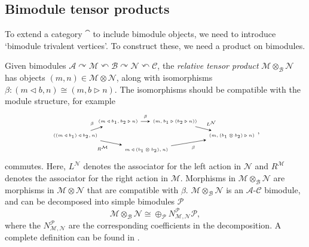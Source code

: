 
\subsection{Bimodule tensor products}\label{sec:bimodtensor}

To extend a category $\cat$ to include bimodule objects, we need to introduce `bimodule trivalent vertices'. To construct these, we need a product on bimodules. 

\begin{definition}
	Given bimodules $\mathcal{A}\curvearrowright\mathcal{M}\curvearrowleft\mathcal{B}\curvearrowright{\mathcal{N}}\curvearrowleft\mathcal{C}$, the \emph{relative tensor product} $\mathcal{M}\otimes_\mathcal{B}\mathcal{N}$ has objects $(m,n)\in \mathcal{M}\otimes\mathcal{N}$, along with isomorphisms $\beta:(m\triangleleft b,n)\cong(m,b\triangleright n)$. The isomorphisms should be compatible with the module structure, for example
	\begin{align}
	\begin{tikzpicture}[scale=.6,baseline=(current bounding box.center)]
	\node (A) at (-1,0) {\tiny{$((m\triangleleft b_1)\triangleleft b_2,n)$}};
	\node (B) at (2,1) {\tiny{$(m\triangleleft b_1,b_2\triangleright n)$}};
	\node (C) at (6,1) {\tiny{$(m,b_1\triangleright(b_2\triangleright n))$}};
	\node (D) at (10,0) {\tiny{$(m,(b_1\otimes b_2)\triangleright n)$}};
	\node (E) at (4,-1) {\tiny{$m\triangleleft (b_1\otimes b_2), n)$}};
	\draw [-stealth,above left] (A)--(B) node [pos=.5] {\tiny{$\beta$}};
	\draw [-stealth,above] (B)--(C) node [pos=.5] {\tiny{$\beta$}};
	\draw [-stealth,above right] (C)--(D) node [pos=.5] {\tiny{$L^\mathcal{N}$}};
	\draw [-stealth,below left] (A)--(E) node [pos=.5] {\tiny{$R^{\mathcal{M}}$}};
	\draw [-stealth,below right] (E)--(D) node [pos=.5] {\tiny{$\beta$}};
	\end{tikzpicture},
	\end{align}
	commutes. Here, $L^\mathcal{N}$ denotes the associator for the left action in $\mathcal{N}$ and $R^\mathcal{M}$ denotes the associator for the right action in $\mathcal{M}$. Morphisms in $\mathcal{M}\otimes_\mathcal{B}\mathcal{N}$ are morphisms in $\mathcal{M}\otimes\mathcal{N}$ that are compatible with $\beta$. $\mathcal{M}\otimes_\mathcal{B}\mathcal{N}$ is an $\mathcal{A}$-$\mathcal{C}$ bimodule, and can be decomposed into simple bimodules $\mathcal{P}$  $$\mathcal{M}\otimes_\mathcal{B}\mathcal{N}\cong\oplus_\mathcal{P}N_{\mathcal{M},\mathcal{N}}^\mathcal{P}\mathcal{P},$$
	where the $N_{\mathcal{M,N}}^\mathcal{P}$ are the corresponding coefficients in the decomposition. A complete definition can be found in \cite{DSPS14}.
\end{definition}

